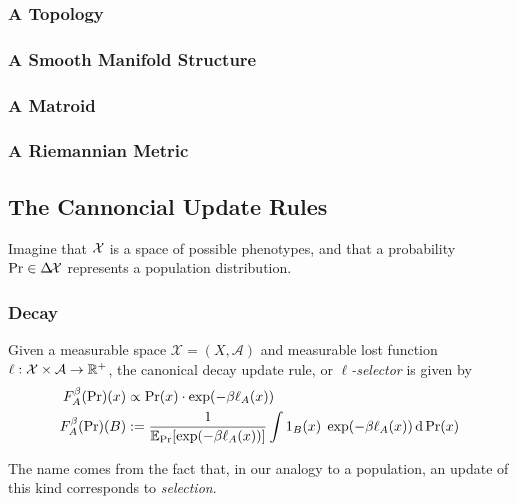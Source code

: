 \documentclass{article}
\begin{document}
\TODO{}

\subsubsection*{A Topology}
\subsubsection*{A Smooth Manifold Structure}
\subsubsection*{A Matroid}
\subsubsection*{A Riemannian Metric}



\subsection{The Cannoncial Update Rules}
Imagine that $\mathcal X$ is a space of possible phenotypes, and that a probability $\Pr \in \Delta\!\mathcal X$ represents a population distribution.

\subsubsection{Decay}
Given a measurable space $\mathcal X = (X, \mathcal A)$ and measurable lost function\\
$\ell: \mathcal X\times\mathcal A \to \mathbb R^+$, the
canonical decay update rule, or \emph{$\ell$-selector} is given by
\def\cost#1#2{\ell_{#2}(#1)}
\begin{align*}
    F^\beta_A(\Pr)(x) &\propto \Pr(x) \cdot \exp(-\beta \cost xA) \\
    F^\beta_A(\Pr)(B) &:=  \frac{1}{\Ex_{\Pr}[\exp(-\beta \cost xA )]}
        \int 1_B(x) \; \exp(-\beta \cost xA ) \,\mathrm d\Pr(x)
\end{align*}

The name comes from the fact that, in our analogy to a population, an update of this kind corresponds to \emph{selection}.
\end{document}
